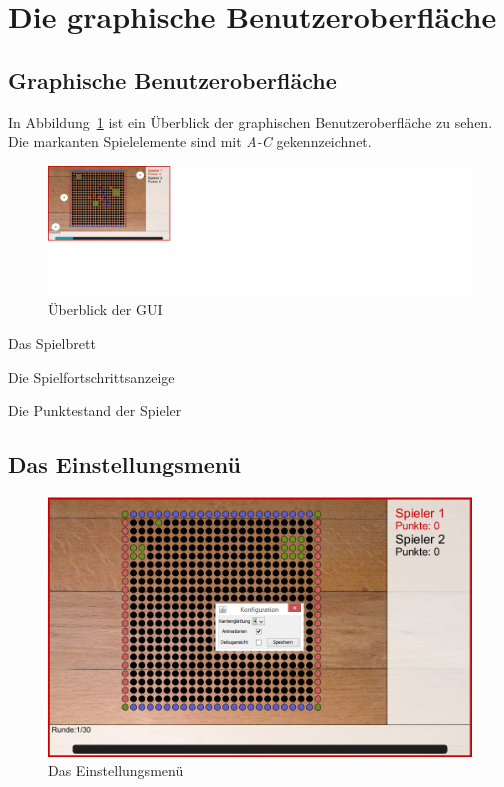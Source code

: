 \documentclass[a4paper, ngerman]{scrartcl}
\begin{document}
\section{Die graphische Benutzeroberfläche}

\subsection{Graphische Benutzeroberfläche}

	 
	In Abbildung~\ref{fig:GUI} ist ein Überblick der graphischen Benutzeroberfläche
	zu sehen. Die markanten Spielelemente sind mit \emph{A-C} gekennzeichnet.
	\begin{figure}[H]
		\centering		
		\includegraphics[scale = 0.6]{bilder/uebersicht.png} 
		\caption{Überblick der GUI}
		\label{fig:GUI}
	\end{figure}
	 
\begin{compactenum}[A)] 
\item Das Spielbrett
\item Die Spielfortschrittsanzeige  
\item Die Punktestand der Spieler
	\end{compactenum}
	
\subsection{Das Einstellungsmenü} 
	 \begin{figure}[H]
		\centering
		\includegraphics[scale=0.6]{bilder/konfiguration.png}
		\caption{Das Einstellungsmenü}
		\label{fig:Configuration}
	\end{figure}
	
\end{document}
